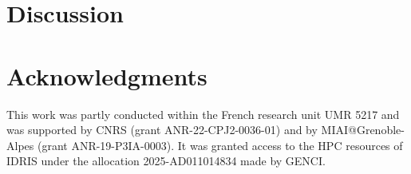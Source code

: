 \documentclass{article} %
\begin{document}
% 

\section{Discussion}
\label{sec:discussion}


\section*{Acknowledgments}
This work was partly conducted within the French research unit UMR 5217 and was supported by CNRS (grant ANR-22-CPJ2-0036-01) and by MIAI@Grenoble-Alpes (grant ANR-19-P3IA-0003). It was granted access to the HPC resources of IDRIS under the allocation 2025-AD011014834 made by GENCI.



\clearpage

\appendix

\end{document}

